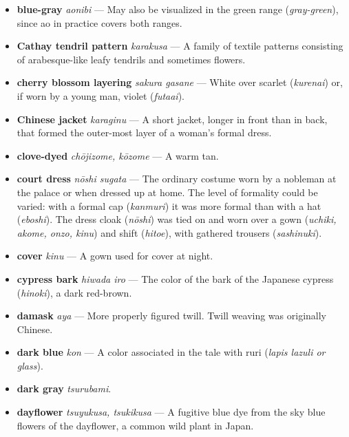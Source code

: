 \documentclass{article}
\begin{document}
\begin{multicols*}{2}
\begin{itemize}[
			label=,
			leftmargin=0em,
			rightmargin=-1.5em,
			itemindent=-2em,
			nosep,
		]
		\item \textbf{blue-gray} \textit{aonibi} --- May also be visualized in the green range (\textit{gray-green}), since ao in practice covers both ranges.

		\item \textbf{Cathay tendril pattern} \textit{karakusa} --- A family of textile patterns consisting of arabesque-like leafy tendrils and sometimes flowers.

		\item \textbf{cherry blossom layering} \textit{sakura gasane} --- White over scarlet (\textit{kurenai}) or, if worn by a young man, violet (\textit{futaai}).

		\item \textbf{Chinese jacket} \textit{karaginu} --- A short jacket, longer in front than in back, that formed the outer-most layer of a woman's formal dress.

		\item \textbf{clove-dyed} \textit{chōjizome, kōzome} --- A warm tan.

		\item \textbf{court dress} \textit{nōshi sugata} --- The ordinary costume worn by a nobleman at the palace or when dressed up at home. The level of formality could be varied: with a formal cap (\textit{kanmuri}) it was more formal than with a hat (\textit{eboshi}). The dress cloak (\textit{nōshi}) was tied on and worn over a gown (\textit{uchiki, akome, onzo, kinu}) and shift (\textit{hitoe}), with gathered trousers (\textit{sashinuki}).

		\item \textbf{cover} \textit{kinu} --- A gown used for cover at night.

		\item \textbf{cypress bark} \textit{hiwada iro} --- The color of the bark of the Japanese cypress (\textit{hinoki}), a dark red-brown.

		\item \textbf{damask} \textit{aya} --- More properly figured twill. Twill weaving was originally Chinese.

		\item \textbf{dark blue} \textit{kon} --- A color associated in the tale with ruri (\textit{lapis lazuli or glass}).

		\item \textbf{dark gray} \textit{tsurubami}.

		\item \textbf{dayflower} \textit{tsuyukusa, tsukikusa} --- A fugitive blue dye from the sky blue flowers of the dayflower, a common wild plant in Japan.


\end{itemize}
\end{multicols*}
\end{document}
